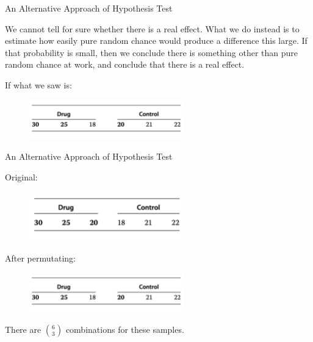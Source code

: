 \documentclass[12pt]{beamer}
\begin{document}
\begin{frame}[fragile]{An Alternative Approach of Hypothesis Test}

We cannot tell for sure whether there is a real effect. What we do instead is to estimate how easily pure random chance would produce a difference this large. If that probability is small, then we conclude there is something other than pure random chance at work, and conclude that there is a real effect.

If what we saw is:

	\begin{figure}
		\begin{center}
			\includegraphics[width=0.6\textwidth]{figure/f09.png}
		\end{center}
	\end{figure}

\end{frame}


\begin{frame}[fragile]{An Alternative Approach of Hypothesis Test}

Original:
	\begin{figure}
		\begin{center}
			\includegraphics[width=0.6\textwidth]{figure/f08.png}
		\end{center}
	\end{figure}

After permutating:
	\begin{figure}
		\begin{center}
			\includegraphics[width=0.6\textwidth]{figure/f09.png}
		\end{center}
	\end{figure}

There are ${6 \choose 3}$ combinations for these samples.

\end{frame}
\end{document}
